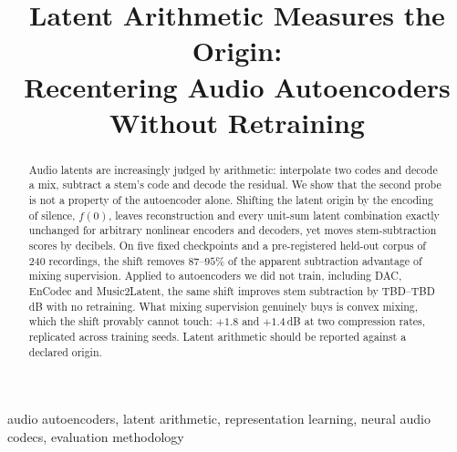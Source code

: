 \documentclass[conference]{IEEEtran}
\begin{document}
\title{Latent Arithmetic Measures the Origin:\\Recentering Audio Autoencoders Without Retraining}

\author{
}

\maketitle

\begin{abstract}
Audio latents are increasingly judged by arithmetic: interpolate two codes and
decode a mix, subtract a stem's code and decode the residual. We show that the
second probe is not a property of the autoencoder alone. Shifting the latent
origin by the encoding of silence, $f(0)$, leaves reconstruction and every
unit-sum latent combination exactly unchanged for arbitrary nonlinear encoders
and decoders, yet moves stem-subtraction scores by decibels. On five fixed
checkpoints and a pre-registered held-out corpus of 240 recordings, the shift
removes $87$--$95$\% of the apparent subtraction advantage of mixing
supervision. Applied to autoencoders we did not train, including DAC, EnCodec
and Music2Latent, the same shift improves stem subtraction by TBD--TBD\,dB
with no retraining. What mixing supervision genuinely buys is convex mixing,
which the shift provably cannot touch: $+1.8$ and $+1.4$\,dB at two
compression rates, replicated across training seeds. Latent arithmetic should
be reported against a declared origin.
\end{abstract}

\begin{IEEEkeywords}
audio autoencoders, latent arithmetic, representation learning,
neural audio codecs, evaluation methodology
\end{IEEEkeywords}
\end{document}
